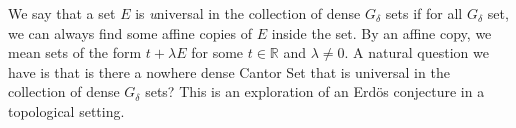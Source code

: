 \documentclass{amsart}
\begin{document}
We  say that a set $E$ is  {\textit universal} in the collection of dense $G_{\delta}$ 
sets if for all $G_{\delta}$ set,  
we can  always find some affine copies of $E$ inside the set. 
By an affine copy, we  mean sets of  the form $t+\lambda E$ 
for some $t \in \mathbb{R}$ and $\lambda\neq 0$. 
A natural question we have is that  is there a nowhere dense Cantor Set that is universal in the collection of dense $G_\delta$ sets? This is an exploration of an Erd\"{o}s conjecture in a topological setting. 
\end{document}
